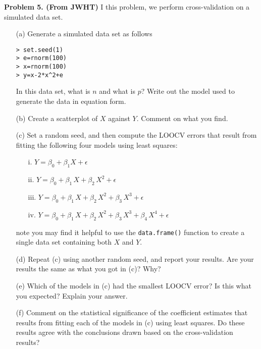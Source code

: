 \documentclass[11pt]{report}
\begin{document}
\noindent
{\bf Problem 5. (From JWHT)} I this problem, we perform cross-validation on a simulated data set. 
\begin{itemize}
\item[(a) ] Generate a simulated data set as follows
\begin{verbatim}
> set.seed(1)
> e=rnorm(100)
> x=rnorm(100)
> y=x-2*x^2+e
\end{verbatim}
In this data set, what is $n$ and what is $p$? Write out the model used to generate the data in equation form.
\item[(b) ] Create a scatterplot of $X$ against $Y$. Comment on what you find.
\item[(c) ] Set a random seed, and then compute the LOOCV errors that result from fitting the following four models using least squares:
\begin{itemize}
\item[i. ] $Y=\beta_0+\beta_1X+\epsilon$
\item[ii. ] $Y=\beta_0+\beta_1\,X+\beta_2\,X^2+\epsilon$
\item[iii. ] $Y=\beta_0+\beta_1\,X+\beta_2\,X^2+\beta_3\,X^3+\epsilon$
\item[iv. ] $Y=\beta_0+\beta_1\,X+\beta_2\,X^2+\beta_3\,X^3+\beta_4\,X^4+\epsilon$
\end{itemize}
note you may find it helpful to use the {\tt data.frame()} function to create a single data set containing both $X$ and $Y$. 
\item[(d) ] Repeat (c) using another random seed, and report your results. Are your results the same as what you got in (c)? Why?
\item[(e) ] Which of the models in (c) had the smallest LOOCV error? Is this what you expected? Explain your answer.
\item[(f) ] Comment on the statistical significance of the coefficient estimates that results from fitting each of the models in (c) using least squares. Do these results agree with the conclusions drawn based on the cross-validation results? 
\end{itemize}
\end{document}
